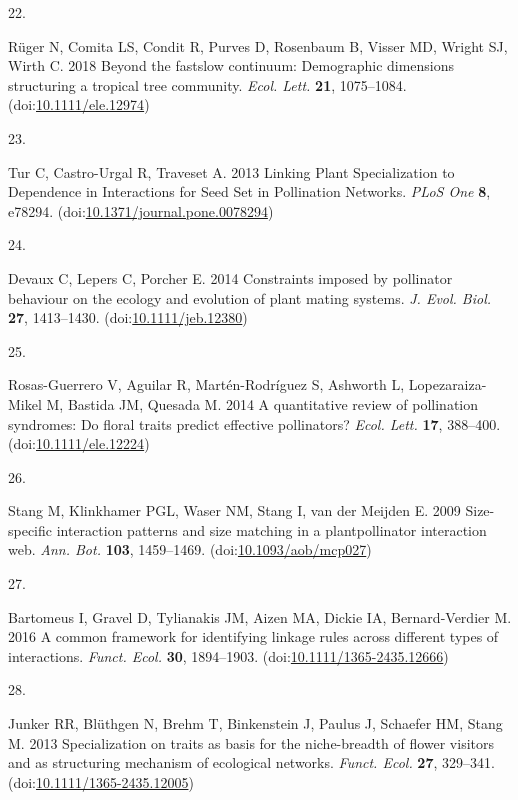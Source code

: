 \documentclass[
  12pt,
  a4paper,
]{article}
\newlength{\cslhangindent}
\newlength{\csllabelwidth}
\newlength{\cslentryspacingunit} %
\newenvironment{CSLReferences}[2] %
 {%
  \setlength{\parindent}{0pt}
  \ifodd #1
  \let\oldpar\par
  \def\par{\hangindent=\cslhangindent\oldpar}
  \fi
  \setlength{\parskip}{#2\cslentryspacingunit}
 }%
 {}
\newcommand{\CSLLeftMargin}[1]{\parbox[t]{\csllabelwidth}{#1}}
\newcommand{\CSLRightInline}[1]{\parbox[t]{\linewidth - \csllabelwidth}{#1}\break}
\begin{document}
\begin{CSLReferences}{0}{0}
\leavevmode{}%
\CSLLeftMargin{22. }
\CSLRightInline{Rüger N, Comita LS, Condit R, Purves D, Rosenbaum B, Visser MD, Wright SJ, Wirth C. 2018 Beyond the fast\textendash slow continuum: Demographic dimensions structuring a tropical tree community. \emph{Ecol. Lett.} \textbf{21}, 1075--1084. (doi:\href{https://doi.org/10.1111/ele.12974}{10.1111/ele.12974})}

\leavevmode{}%
\CSLLeftMargin{23. }
\CSLRightInline{Tur C, Castro-Urgal R, Traveset A. 2013 Linking {Plant Specialization} to {Dependence} in {Interactions} for {Seed Set} in {Pollination Networks}. \emph{PLoS One} \textbf{8}, e78294. (doi:\href{https://doi.org/10.1371/journal.pone.0078294}{10.1371/journal.pone.0078294})}

\leavevmode{}%
\CSLLeftMargin{24. }
\CSLRightInline{Devaux C, Lepers C, Porcher E. 2014 Constraints imposed by pollinator behaviour on the ecology and evolution of plant mating systems. \emph{J. Evol. Biol.} \textbf{27}, 1413--1430. (doi:\href{https://doi.org/10.1111/jeb.12380}{10.1111/jeb.12380})}

\leavevmode{}%
\CSLLeftMargin{25. }
\CSLRightInline{Rosas-Guerrero V, Aguilar R, Martén-Rodríguez S, Ashworth L, Lopezaraiza-Mikel M, Bastida JM, Quesada M. 2014 A quantitative review of pollination syndromes: Do floral traits predict effective pollinators? \emph{Ecol. Lett.} \textbf{17}, 388--400. (doi:\href{https://doi.org/10.1111/ele.12224}{10.1111/ele.12224})}

\leavevmode{}%
\CSLLeftMargin{26. }
\CSLRightInline{Stang M, Klinkhamer PGL, Waser NM, Stang I, van der Meijden E. 2009 Size-specific interaction patterns and size matching in a plant\textendash pollinator interaction web. \emph{Ann. Bot.} \textbf{103}, 1459--1469. (doi:\href{https://doi.org/10.1093/aob/mcp027}{10.1093/aob/mcp027})}

\leavevmode{}%
\CSLLeftMargin{27. }
\CSLRightInline{Bartomeus I, Gravel D, Tylianakis JM, Aizen MA, Dickie IA, Bernard-Verdier M. 2016 A common framework for identifying linkage rules across different types of interactions. \emph{Funct. Ecol.} \textbf{30}, 1894--1903. (doi:\href{https://doi.org/10.1111/1365-2435.12666}{10.1111/1365-2435.12666})}

\leavevmode{}%
\CSLLeftMargin{28. }
\CSLRightInline{Junker RR, Blüthgen N, Brehm T, Binkenstein J, Paulus J, Schaefer HM, Stang M. 2013 Specialization on traits as basis for the niche-breadth of flower visitors and as structuring mechanism of ecological networks. \emph{Funct. Ecol.} \textbf{27}, 329--341. (doi:\href{https://doi.org/10.1111/1365-2435.12005}{10.1111/1365-2435.12005})}


\end{CSLReferences}
\end{document}
